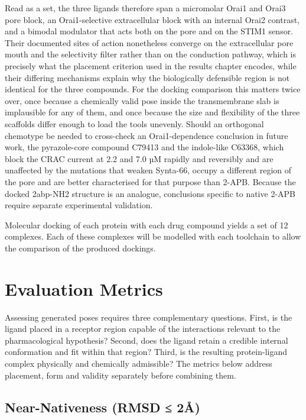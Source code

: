 Read as a set, the three ligands therefore span a micromolar Orai1 and Orai3 pore block, an Orai1-selective extracellular block with an internal Orai2 contrast, and a bimodal modulator that acts both on the pore and on the STIM1 sensor. Their documented sites of action nonetheless converge on the extracellular pore mouth and the selectivity filter rather than on the conduction pathway, which is precisely what the placement criterion used in the results chapter encodes, while their differing mechanisms explain why the biologically defensible region is not identical for the three compounds. For the docking comparison this matters twice over, once because a chemically valid pose inside the transmembrane slab is implausible for any of them, and once because the size and flexibility of the three scaffolds differ enough to load the tools unevenly. Should an orthogonal chemotype be needed to cross-check an Orai1-dependence conclusion in future work, the pyrazole-core compound C79413 and the indole-like C63368, which block the CRAC current at 2.2 and 7.0 µM rapidly and reversibly and are unaffected by the mutations that weaken Synta-66, occupy a different region of the pore and are better characterised for that purpose than 2-APB. Because the docked 2abp-NH2 structure is an analogue, conclusions specific to native 2-APB require separate experimental validation.

Molecular docking of each protein with each drug compound yields a set of 12 complexes. Each of these complexes will be modelled with each toolchain to allow the comparison of the produced dockings.

\hypertarget{evaluation-metrics}{%
\section{Evaluation Metrics}\label{evaluation-metrics}}

Assessing generated poses requires three complementary questions. First, is the ligand placed in a receptor region capable of the interactions relevant to the pharmacological hypothesis? Second, does the ligand retain a credible internal conformation and fit within that region? Third, is the resulting protein-ligand complex physically and chemically admissible? The metrics below address placement, form and validity separately before combining them.

\hypertarget{near-nativeness-rmsd-2uxe5}{%
\subsection{Near-Nativeness (RMSD ≤ 2Å)}\label{near-nativeness-rmsd-2uxe5}}

